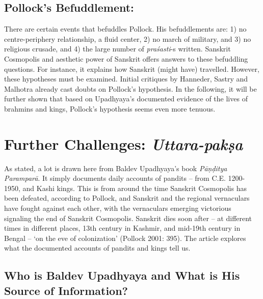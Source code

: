 \vspace{-.3cm}

\subsection*{Pollock’s Befuddlement:}

There are certain events that befuddles Pollock. His befuddlements are: 1) no centre-periphery relationship, a fluid center, 2) no march of military, and 3) no religious crusade, and 4) the large number of \textit{praśasti}-s written. Sanskrit Cosmopolis and aesthetic power of Sanskrit offers answers to these befuddling questions. For instance, it explains how Sanskrit (might have) travelled. However, these hypotheses must be examined. Initial critiques by Hanneder, Sastry and Malhotra already cast doubts on Pollock’s hypothesis. In the following, it will be further shown that based on Upadhyaya’s documented evidence of the lives of brahmins and kings, Pollock’s hypothesis seems even more tenuous.

\vspace{-.3cm}

\section*{Further Challenges: \textit{Uttara-pakṣa}}

As stated, a lot is drawn here from Baldev Upadhyaya’s book \textit{Pāṇḍitya Paramparā}. It simply documents daily accounts of pandits – from C.E. 1200-1950, and Kashi kings. This is from around the time Sanskrit Cosmopolis has been defeated, according to Pollock, and Sanskrit and the regional vernaculars have fought against each other, with the vernaculars emerging victorious signaling the end of Sanskrit Cosmopolis. Sanskrit dies soon after – at different times in different places, 13th century in Kashmir, and mid-19th century in Bengal – ‘on the eve of colonization’ (Pollock 2001: 395). The article explores what the documented accounts of pandits and kings tell us.

\vspace{-.3cm}

\subsection*{Who is Baldev Upadhyaya and \hfill\break What is His Source of Information?}

